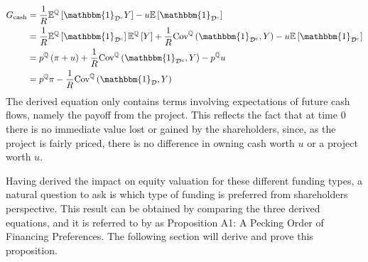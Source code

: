 \documentclass[main.tex]{subfiles}
\begin{document}
            \begin{align}
                G_{\text{cash}} &=
                    \discountfactor
                    \mathbb{E}^{\mathbb{Q}}\left[
                        \mathbbm{1}_{\mathcal{D}^{c}} Y
                    \right]
                    -
                    u
                    \mathbb{E}\left[\mathbbm{1}_{\mathcal{D}^{c}} \right]
                    \nonumber \\
                &=
                    \discountfactor
                    \mathbb{E}^{\mathbb{Q}}\left[\mathbbm{1}_{\mathcal{D}^{c}}\right] 
                    \mathbb{E}^{\mathbb{Q}}\left[Y\right] 
                    + 
                    \discountfactor
                    \text{Cov}^{\mathbb{Q}}\left(\mathbbm{1}_{\mathcal{D}^{c}}, Y\right) 
                    -
                    u
                    \mathbb{E}\left[\mathbbm{1}_{\mathcal{D}^{c}} \right]
                    \nonumber \\
                &= 
                    p^{\mathbb{Q}}
                    \left(
                        \pi + u
                    \right)
                    +
                    \discountfactor
                    \text{Cov}^{\mathbb{Q}}\left(\mathbbm{1}_{\mathcal{D}^{c}}, Y\right) 
                    -
                    p^{\mathbb{Q}}
                    u
                    \nonumber \\
                &=
                    p^{\mathbb{Q}}
                    \pi
                    -
                    \discountfactor
                    \text{Cov}^{\mathbb{Q}}\left(\mathbbm{1}_{\mathcal{D}}, Y\right) 
                \label{eqn:marginal-shareholder-value-cash-financing}
            \end{align}
        The derived equation only contains terms involving expectations of future cash flows,
        namely the payoff from the project.
        This reflects the fact that at time 0 there is no immediate value lost or gained
        by the shareholders, since, as the project is fairly priced, there is no difference
        in owning cash worth $u$ or a project worth $u$.

        Having derived the impact on equity valuation for these different funding types,
        a natural question to ask is which type of funding is preferred from shareholders perspective.
        This result can be obtained by comparing the three derived equations,
        and it is referred to by \textcite{ADS2016} as Proposition A1: A Pecking Order of Financing Preferences.
        The following section will derive and prove this proposition.
\end{document}
